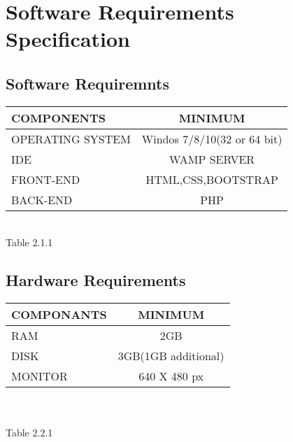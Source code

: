 \chapter{Software Requirements Specification}
\section{Software Requiremnts}
\begin{center}
  \begin{tabular}{ | l | c |}
    \hline \hline
    \textbf{COMPONENTS} &  \textbf{MINIMUM} \\ \hline
    OPERATING SYSTEM & Windos 7/8/10(32 or 64 bit) \\ \hline
    IDE &  WAMP SERVER \\ \hline
    FRONT-END & HTML,CSS,BOOTSTRAP \\ \hline
    BACK-END & PHP \\ \hline
    \hline
  \end{tabular}\\ 
  \vspace{1cm}
  Table 2.1.1
\end{center}
    
\section{Hardware Requirements}
\begin{center}
  \begin{tabular}{ | l | c |}
    \hline \hline
    \textbf{COMPONANTS} &  \textbf{MINIMUM} \\ \hline
    RAM & 2GB \\ \hline
    DISK &  3GB(1GB additional)  \\ \hline
    MONITOR & 640 X 480 px \\ \hline
    \hline
  \end{tabular}\\ \\
  \vspace{1cm}
  Table 2.2.1
\end{center}